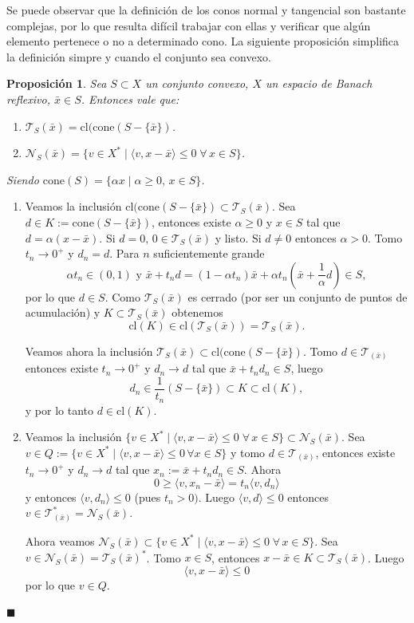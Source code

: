 \documentclass[a4paper,10pt]{book}
\newcommand{\bx}{\bar{x}}
\newcommand{\cN}{\mathcal{N}}
\newcommand{\cT}{\mathcal{T}}
\newcommand{\la}{\langle}
\newcommand{\ra}{\rangle}
\newtheorem{prop}[teo]{Proposici\'on}
\newenvironment{dem}{\vspace*{-0.1cm}{\it Demostraci\'on:}}{\hfill
$\blacksquare$\\}
\begin{document}
Se puede observar que la definición de los conos normal y tangencial son bastante complejas, por lo que resulta difícil trabajar con ellas y verificar que algún elemento pertenece o no a determinado cono. La siguiente proposición simplifica la definición simpre y cuando el conjunto sea convexo.



\begin{prop}\label{conoconv}
Sea $S\subset X$ un conjunto convexo, $X$ un espacio de Banach reflexivo, $\bx\in S$. Entonces vale que:
\begin{enumerate}
\item $\cT_{S}(\bx)=\mathrm{cl}(\mathrm{cone}(S-\{\bx\})$.
\item $\cN_{S}(\bx)=\{v\in X^*\mid\langle v,x-\bx\rangle\leq 0\; \forall\,x\in S\}$.
\end{enumerate}
Siendo $\mathrm{cone}(S)=\{\alpha x\mid \alpha\geq0,\,x\in S\}$.
\end{prop} 
\begin{dem}
\begin{enumerate}
\item Veamos la inclusión $\mathrm{cl}(\mathrm{cone}(S-\{\bx\})\subset\cT_{S}(\bx)$. Sea $d\in K:=\mathrm{cone}(S-\{\bx\})$, entonces existe $\alpha\geq0$ y $x\in S$ tal que $d=\alpha(x-\bx)$. Si $d=0,\, 0\in \cT_S(\bx)$ y listo.
Si $d\neq0$ entonces $\alpha>0$. Tomo $t_n\to0^+$ y $d_n=d$. Para $n$ suficientemente grande $$\alpha t_n\in (0,1)\mbox{ y }\bx+t_nd=(1-\alpha t_n)\bx+\alpha t_n(\bx+\frac{1}{\alpha}d)\in S,$$ por lo que $d\in S$. Como $\cT_S(\bx)$ es cerrado (por ser un conjunto de puntos de acumulación) y $K\subset\cT_S(\bx)$ obtenemos $$\mathrm{cl}(K)\in\mathrm{cl}(\cT_S(\bx))=\cT_S(\bx).$$

Veamos ahora la inclusión $\cT_{S}(\bx)\subset\mathrm{cl}(\mathrm{cone}(S-\{\bx\})$. Tomo $d\in\cT_(\bx)$ entonces existe $t_n\to0^+$ y $d_n\to d$ tal que $\bx+t_nd_n\in S$, luego $$d_n\in\frac{1}{t_n}(S-\{\bx\})\subset K\subset\mathrm{cl}(K),$$ y por lo tanto $d\in \mathrm{cl}(K)$.
\item Veamos la inclusión $\{v\in X^*\mid\langle v,x-\bx\rangle\leq 0\; \forall\,x\in S\}\subset\cN_{S}(\bx)$. Sea $v\in Q:=\{v\in X^*\mid \la v,x-\bx\ra\leq0\,\forall x\in S\}$ y tomo $d\in\cT_(\bx)$, entonces existe $t_n\to 0^+$ y $d_n\to d$ tal que $x_n:=\bx+t_nd_n\in S$. Ahora $$0\geq \la v , x_n-\bx\ra=t_n\la v,d_n\ra$$ y entonces $\la v ,d_n\ra\leq0$ (pues $t_n>0)$. Luego $\la v,d\ra\leq0$ entonces $v\in\cT_(\bx)^*=\cN_S(\bx)$.

Ahora veamos $\cN_{S}(\bx)\subset\{v\in X^*\mid\langle v,x-\bx\rangle\leq 0\;\forall\,x\in S\}$. Sea $v\in\cN_S(\bx)=\cT_S(\bx)^*$. Tomo $x\in S$, entonces $x-\bx\in K\subset\cT_S(\bx)$. Luego $$\la v ,x-\bx\ra\leq0$$ por lo que $v\in Q$.
\end{enumerate}
\end{dem}
\end{document}
